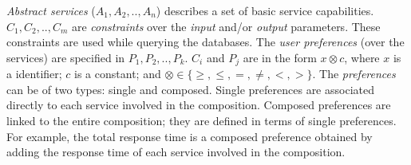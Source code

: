 \begin{defi}
\textit{Abstract services} ($A_{1}, A_{2}, .., A_{n}$) describes a set of basic service capabilities.
%
$C_{1}, C_{2}, .., C_{m}$ are \textit{constraints} over the \textit{input} and/or \textit{output} parameters. These constraints are used while querying the databases. 
The \textit{user preferences} (over the services) are specified in $P_{1}, P_{2}, .., P_{k}$.  
%
$C_{i}$ and $P_{j}$ are in the form $x \otimes c$, where $x$ is a identifier; $c$ is a constant; and
$\otimes \in\lbrace \geq, \leq, =, \neq, <, >\rbrace$.
%
The \textit{preferences} can be of two types: single and composed. Single preferences are associated directly to each service involved in the composition. Composed preferences are linked to the entire composition; they are defined in terms of single preferences. For example, the total response time is a composed preference obtained by adding the response time of each service involved in the composition. 
\end{defi}

